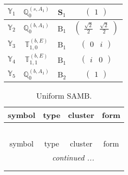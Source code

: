 \documentclass[fleqn,10pt,landscape]{article}
\begin{document}
\begin{itemize}
\begin{center}
\begin{longtable}{c|c|c|c}
$ \mathbb{Y}_{1} $ & $\mathbb{Q}_{0}^{(s,A_{1})}$ & S$_{1}$ & $\begin{pmatrix} 1 \end{pmatrix}$ \\ \hline
$ \mathbb{Y}_{2} $ & $\mathbb{Q}_{0}^{(b,A_{1})}$ & B$_{1}$ & $\begin{pmatrix} \frac{\sqrt{2}}{2} & \frac{\sqrt{2}}{2} \end{pmatrix}$ \\
$ \mathbb{Y}_{3} $ & $\mathbb{T}_{1,0}^{(b,E)}$ & B$_{1}$ & $\begin{pmatrix} 0 & i \end{pmatrix}$ \\
$ \mathbb{Y}_{4} $ & $\mathbb{T}_{1,1}^{(b,E)}$ & B$_{1}$ & $\begin{pmatrix} i & 0 \end{pmatrix}$ \\ \hline
$ \mathbb{Y}_{5} $ & $\mathbb{Q}_{0}^{(b,A_{1})}$ & B$_{2}$ & $\begin{pmatrix} 1 \end{pmatrix}$ \\
\end{longtable}
\end{center}
\begin{center}
\renewcommand{\arraystretch}{1.3}
\begin{longtable}{c|c|c|c}
\caption{Uniform SAMB.}
 \\
 \hline \hline
symbol & type & cluster & form \\ \hline \endfirsthead

\multicolumn{3}{l}{\tablename\ \thetable{}} \\
 \hline \hline
symbol & type & cluster & form \\ \hline \endhead

 \hline \hline
\multicolumn{3}{r}{\footnotesize\it continued ...} \\ \endfoot

 \hline \hline
\multicolumn{3}{r}{} \\ \endlastfoot


\end{longtable}
\end{center}
\end{itemize}
\end{document}
